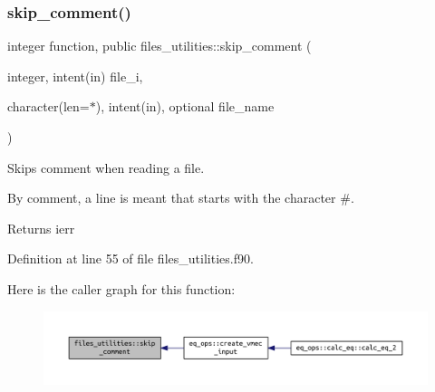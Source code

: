 \subsubsection{\texorpdfstring{skip\+\_\+comment()}{skip\_comment()}}
{\footnotesize\ttfamily integer function, public files\+\_\+utilities\+::skip\+\_\+comment (\begin{DoxyParamCaption}\item[{integer, intent(in)}]{file\+\_\+i,  }\item[{character(len=$\ast$), intent(in), optional}]{file\+\_\+name }\end{DoxyParamCaption})}



Skips comment when reading a file. 

By comment, a line is meant that starts with the character {\ttfamily \#}.

\begin{DoxyReturn}{Returns}
ierr 
\end{DoxyReturn}


Definition at line 55 of file files\+\_\+utilities.\+f90.

Here is the caller graph for this function\+:\nopagebreak
\begin{figure}[H]
\begin{center}
\leavevmode
\includegraphics[width=350pt]{namespacefiles__utilities_ac5befac3b753b28003e6878bec2af381_icgraph}
\end{center}
\end{figure}
